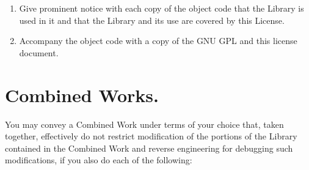 \documentclass[a4paper, 12pt]{article}
\begin{document}
\begin{enumerate}[label=\alph*)]
\item Give prominent notice with each copy of the object code that the Library is used in it and that the Library and its use are covered by this License.
\item Accompany the object code with a copy of the GNU GPL and this license document.
\end{enumerate}

\section{Combined Works.}

You may convey a Combined Work under terms of your choice that, taken together, effectively do not restrict modification of the portions of the Library contained in the Combined Work and reverse engineering for debugging such modifications, if you also do each of the following:
\end{document}
